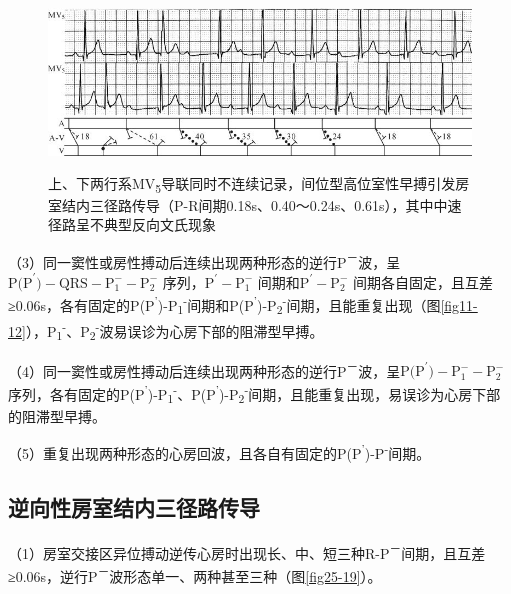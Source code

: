 \begin{figure}[!htbp]
 \centering
 \includegraphics[width=5.22917in,height=1.8125in]{./images/Image00429.jpg}
 \captionsetup{justification=centering}
 \caption{上、下两行系MV\textsubscript{5}导联同时不连续记录，间位型高位室性早搏引发房室结内三径路传导（P-R间期0.18s、0.40～0.24s、0.61s），其中中速径路呈不典型反向文氏现象}
 \label{fig25-18}
  \end{figure} 


（3）同一窦性或房性搏动后连续出现两种形态的逆行P\textsuperscript{－}波，呈$\text{P(P}^\prime\text{)}-\text{QRS}-\text{P}_1^--\text{P}_2^-$
序列，$\text{P}^\prime-\text{P}_1^-$
间期和$\text{P}^\prime-\text{P}_2^-$
间期各自固定，且互差≥0.06s，各有固定的P(P\textsuperscript{'})-P\textsubscript{1}\textsuperscript{-}间期和P(P\textsuperscript{'})-P\textsubscript{2}\textsuperscript{-}间期，且能重复出现（图\ref{fig11-12}），P\textsubscript{1}\textsuperscript{-}、P\textsubscript{2}\textsuperscript{-}波易误诊为心房下部的阻滞型早搏。

（4）同一窦性或房性搏动后连续出现两种形态的逆行P\textsuperscript{－}波，呈$\text{P(P}^\prime\text{)}-\text{P}_1^--\text{P}_2^-$
序列，各有固定的P(P\textsuperscript{'})-P\textsubscript{1}\textsuperscript{-}、P(P\textsuperscript{'})-P\textsubscript{2}\textsuperscript{-}间期，且能重复出现，易误诊为心房下部的阻滞型早搏。

（5）重复出现两种形态的心房回波，且各自有固定的P(P\textsuperscript{'})-P\textsuperscript{-}间期。

\protect\hypertarget{text00032.htmlux5cux23subid386}{}{}

\subsection{逆向性房室结内三径路传导}

（1）房室交接区异位搏动逆传心房时出现长、中、短三种R-P\textsuperscript{－}间期，且互差≥0.06s，逆行P\textsuperscript{－}波形态单一、两种甚至三种（图\ref{fig25-19}）。

